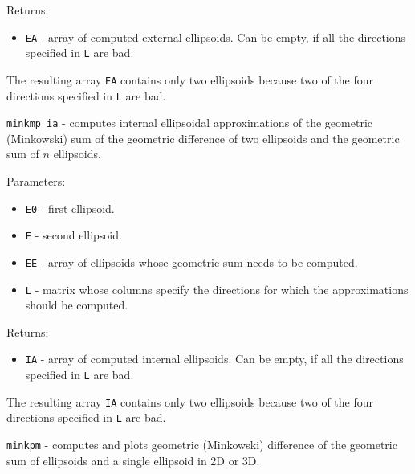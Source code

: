 \documentclass{report}
\begin{document}
Returns:
\begin{itemize}
\item {\tt EA} - array of computed external ellipsoids. Can be empty, if
all the directions specified in {\tt L} are bad.
\end{itemize}


The resulting array {\tt EA} contains only two ellipsoids because two
of the four directions specified in {\tt L} are bad.

\newpage

{\Large {\tt minkmp\_ia}} - computes internal ellipsoidal approximations
of the geometric (Minkowski) sum of the geometric difference of two ellipsoids
and the geometric sum of $n$ ellipsoids.

Parameters:
\begin{itemize}
\item {\tt E0} - first ellipsoid.
\item {\tt E} - second ellipsoid.
\item {\tt EE} - array of ellipsoids whose geometric sum needs to be computed.
\item {\tt L} - matrix whose columns specify the directions for which
the approximations should be computed.
\end{itemize}

Returns:
\begin{itemize}
\item {\tt IA} - array of computed internal ellipsoids. Can be empty, if
all the directions specified in {\tt L} are bad.
\end{itemize}


The resulting array {\tt IA} contains only two ellipsoids because two
of the four directions specified in {\tt L} are bad.

\newpage

{\Large {\tt minkpm}} - computes and plots geometric (Minkowski) difference of
the geometric sum of ellipsoids and a single ellipsoid in 2D or 3D.
\end{document}
